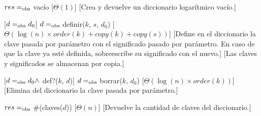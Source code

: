 \begin{Interfaz}
  
  \begin{paramFormales}
    \paramGeneros{$\kappa$, $\sigma$}




  \end{paramFormales}


  \generos{\tipo{\diccLogKS}}


    {$res =_{\mathrm{obs}}$ vac\'io}
    [$\Theta(1)$]
    [Crea y devuelve un diccionario logar\'itmico vac\'io.]

    [$d =_{\mathrm{obs}} d_0$]
    {$d =_{\mathrm{obs}}$ definir($k$, $s$, $d_0$)}
    [$\Theta(\log(n) \times order(k) + copy(k) + copy(s))$]
    [Define en el diccionario la clave pasada por par\'ametro con el significado pasado por par\'ametro. En caso de que la clave ya est\'e definida, sobreescribe su significado con el nuevo.]
    [Las claves y significados se almacenan por copia.]

    [$d =_{\mathrm{obs}} d_0 \land$ def?($k$, $d$)]
    {$d =_{\mathrm{obs}}$ borrar($k$, $d_0$)}
    [$\Theta(\log(n) \times order(k))$]
    [Elimina del diccionario la clave pasada por par\'ametro.]

    {$res =_{\mathrm{obs}}$ \#(claves($d$))}
    [$\Theta(n)$]
    [Devuelve la cantidad de claves del diccionario.]


\end{Interfaz}

